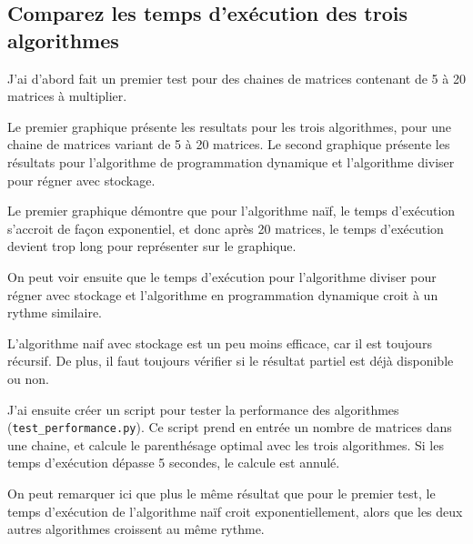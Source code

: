 \documentclass[10.9pt]{article} %
\begin{document}
\subsection{Comparez les temps d'exécution des trois algorithmes}

J'ai d'abord fait un premier test pour des chaines de matrices contenant de
5 à 20 matrices à multiplier.

Le premier
graphique présente les resultats pour les trois algorithmes, pour une chaine
de matrices variant de 5 à 20 matrices. Le second graphique présente les
résultats pour l'algorithme de programmation dynamique et l'algorithme
diviser pour régner avec stockage.

Le premier graphique démontre que pour l'algorithme naïf, le temps d'exécution s'accroit
de façon exponentiel, et donc après 20 matrices, le temps d'exécution
devient trop long pour représenter sur le graphique.

On peut voir ensuite que le temps d'exécution pour l'algorithme diviser
pour régner avec stockage et l'algorithme en programmation dynamique
croit à un rythme similaire.

L'algorithme naif avec stockage est un peu moins efficace, car il est toujours
récursif. De plus, il faut toujours vérifier si le résultat partiel est
déjà disponible ou non.

J'ai ensuite créer un script pour tester la performance des algorithmes (\texttt{test\_performance.py}).
Ce script prend en entrée un nombre de matrices dans une chaine, et calcule le parenthésage optimal
avec les trois algorithmes. Si les temps d'exécution dépasse 5 secondes, le calcule est annulé.

On peut remarquer ici que plus le même résultat que pour le premier test, le temps d'exécution de
l'algorithme naïf croit exponentiellement, alors que les deux autres algorithmes croissent au 
même rythme.
\end{document}

